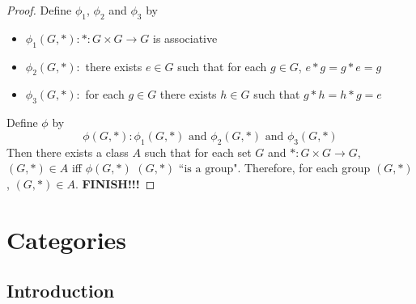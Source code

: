 \documentclass{book}
\theoremstyle{definition}
\DeclareMathOperator*{\0}{\mbf{0}}
\DeclareMathOperator*{\1}{\mbf{1}}
\begin{document}
	\begin{proof}
		Define $\phi_1$, $\phi_2$ and $\phi_3$ by 
		\begin{itemize}
			\item $\phi_1(G, *): *:G \times G \rightarrow G$ is associative
			\item $\phi_2(G, *):$ there exists $e \in G$ such that for each $g \in G$, $e * g = g * e = g$
			\item $\phi_3(G, *):$ for each $g \in G$ there exists $h \in G$ such that $g * h = h * g = e$
		\end{itemize}
		Define $\phi$ by 
		$$\phi(G, *) : \phi_1(G, *) \text{ and } \phi_2(G, *) \text{ and } \phi_3(G, *)$$
		Then there exists a class $A$ such that for each set $G$ and  $*: G \times G \rightarrow G$, $(G, *) \in A$ iff $\phi(G, *)$ $(G, *) \text{ ``is a group"}$. Therefore, for each group $(G, *)$, $(G, *) \in A$.
		\textbf{FINISH!!!}
	\end{proof}

	
	
	
	
	
	
	
	
	
	
	
	
	
	
	
	
	
	
	
	
	
	
	
	
	
	
	
	
	
	
	
	
	
	
	
	\newpage
	\section{Categories}
	
	\subsection{Introduction}
	
\end{document}

